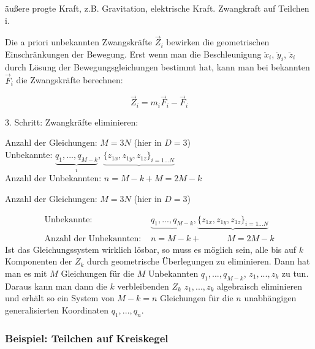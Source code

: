 \documentclass[10pt, letterpaper]{article}
\begin{document}
äußere progte Kraft, z.B. Gravitation, elektrische Kraft. \quad Zwangkraft auf Teilchen i.

Die a priori unbekannten Zwangskräfte $\vec{Z}_i$ bewirken die geometrischen Einschränkungen der Bewegung. Erst wenn man die Beschleunigung $\ddot{x}_i$, $\ddot{y}_i$, $\ddot{z}_i$ durch Lösung der Bewegungsgleichungen bestimmt hat, kann man bei bekannten $\vec{F}_i$ die Zwangskräfte berechnen:

\[\vec{Z}_i = m_i\vec{F}_i - \vec{F}_i\]



3. Schritt: Zwangkräfte eliminieren:

Anzahl der Gleichungen: $M = 3N$ (hier in $D=3$)\\
Unbekannte: $\underbrace{q_1,...,q_{M-k}}_{i}$, $\underbrace{\{z_{1x},z_{1y},z_{1z}\}_{i=1...N}}$\\
Anzahl der Unbekannten: $n=M-k + M = 2M-k$

Anzahl der Gleichungen: $M = 3N$ (hier in $D=3$)

$$
\begin{aligned}
\text{Unbekannte: } & \underbrace{q_1,...,q_{M-k}}_{}, \underbrace{\{z_{1x},z_{1y},z_{1z}\}_{i=1...N}}\\
\text{Anzahl der Unbekannten: } & n=M-k +\qquad \quad M = 2M-k
\end{aligned}
$$
Ist das Gleichungssystem wirklich lösbar, so muss es möglich sein, alle bis auf $k$ Komponenten der $Z_k$ durch geometrische Überlegungen zu eliminieren. Dann hat man es mit $M$ Gleichungen für die $M$ Unbekannten $q_1,...,q_{M-k}$, $z_1,...,z_k$ zu tun. Daraus kann man dann die $k$ verbleibenden $Z_k$ $z_1,...,z_k$ algebraisch eliminieren und erhält so ein System von $M-k=n$ Gleichungen für die $n$ unabhängigen generalisierten Koordinaten $q_1,...,q_n$.








\subsubsection{Beispiel: Teilchen auf Kreiskegel}
\end{document}

